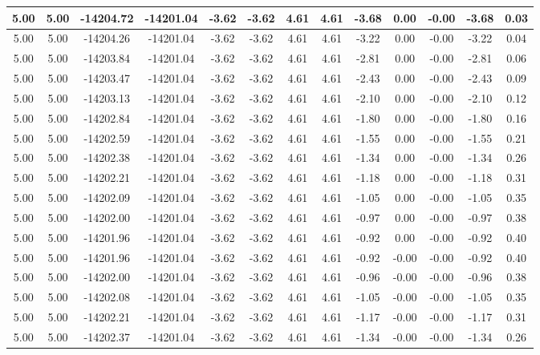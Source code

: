 \begin{table}[htbp]
\begin{adjustbox}{angle=90}
\begin{tabular}{|c|c|c|c|c|c|c|c|c|c|c|c|c|}
 5.00 & 5.00 & -14204.72 & -14201.04 & -3.62 & -3.62 & 4.61 & 4.61 & -3.68 & 0.00 & -0.00 & -3.68 & 0.03\\ \hline
 5.00 & 5.00 & -14204.26 & -14201.04 & -3.62 & -3.62 & 4.61 & 4.61 & -3.22 & 0.00 & -0.00 & -3.22 & 0.04\\ \hline
 5.00 & 5.00 & -14203.84 & -14201.04 & -3.62 & -3.62 & 4.61 & 4.61 & -2.81 & 0.00 & -0.00 & -2.81 & 0.06\\ \hline
 5.00 & 5.00 & -14203.47 & -14201.04 & -3.62 & -3.62 & 4.61 & 4.61 & -2.43 & 0.00 & -0.00 & -2.43 & 0.09\\ \hline
 5.00 & 5.00 & -14203.13 & -14201.04 & -3.62 & -3.62 & 4.61 & 4.61 & -2.10 & 0.00 & -0.00 & -2.10 & 0.12\\ \hline
 5.00 & 5.00 & -14202.84 & -14201.04 & -3.62 & -3.62 & 4.61 & 4.61 & -1.80 & 0.00 & -0.00 & -1.80 & 0.16\\ \hline
 5.00 & 5.00 & -14202.59 & -14201.04 & -3.62 & -3.62 & 4.61 & 4.61 & -1.55 & 0.00 & -0.00 & -1.55 & 0.21\\ \hline
 5.00 & 5.00 & -14202.38 & -14201.04 & -3.62 & -3.62 & 4.61 & 4.61 & -1.34 & 0.00 & -0.00 & -1.34 & 0.26\\ \hline
 5.00 & 5.00 & -14202.21 & -14201.04 & -3.62 & -3.62 & 4.61 & 4.61 & -1.18 & 0.00 & -0.00 & -1.18 & 0.31\\ \hline
 5.00 & 5.00 & -14202.09 & -14201.04 & -3.62 & -3.62 & 4.61 & 4.61 & -1.05 & 0.00 & -0.00 & -1.05 & 0.35\\ \hline
 5.00 & 5.00 & -14202.00 & -14201.04 & -3.62 & -3.62 & 4.61 & 4.61 & -0.97 & 0.00 & -0.00 & -0.97 & 0.38\\ \hline
 5.00 & 5.00 & -14201.96 & -14201.04 & -3.62 & -3.62 & 4.61 & 4.61 & -0.92 & 0.00 & -0.00 & -0.92 & 0.40\\ \hline
 5.00 & 5.00 & -14201.96 & -14201.04 & -3.62 & -3.62 & 4.61 & 4.61 & -0.92 & -0.00 & -0.00 & -0.92 & 0.40\\ \hline
 5.00 & 5.00 & -14202.00 & -14201.04 & -3.62 & -3.62 & 4.61 & 4.61 & -0.96 & -0.00 & -0.00 & -0.96 & 0.38\\ \hline
 5.00 & 5.00 & -14202.08 & -14201.04 & -3.62 & -3.62 & 4.61 & 4.61 & -1.05 & -0.00 & -0.00 & -1.05 & 0.35\\ \hline
 5.00 & 5.00 & -14202.21 & -14201.04 & -3.62 & -3.62 & 4.61 & 4.61 & -1.17 & -0.00 & -0.00 & -1.17 & 0.31\\ \hline
 5.00 & 5.00 & -14202.37 & -14201.04 & -3.62 & -3.62 & 4.61 & 4.61 & -1.34 & -0.00 & -0.00 & -1.34 & 0.26\\ \hline

\end{tabular}
\end{adjustbox}
\end{table}
